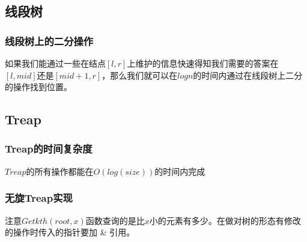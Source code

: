 \documentclass[11pt]{article}
\begin{document}
\subsection{线段树}
\label{sec-6-4}
\subsubsection{线段树上的二分操作}
\label{sec-6-4-1}

如果我们能通过一些在结点\([l,r]\)上维护的信息快速得知我们需要的答案在\([l,mid]\)还是\([mid+1,r]\)，那么我们就可以在\(logn\)的时间内通过在线段树上二分的操作找到位置。
\subsection{Treap}
\label{sec-6-5}

\subsubsection{Treap的时间复杂度}
\label{sec-6-5-1}

\(Treap\)的所有操作都能在\(O(log(size))\)的时间内完成

\subsubsection{无旋Treap实现}
\label{sec-6-5-2}

注意\(Getkth(root,x)\)函数查询的是比\(x\)小的元素有多少。在做对树的形态有修改的操作时传入的指针要加 \& 引用。
\end{document}

